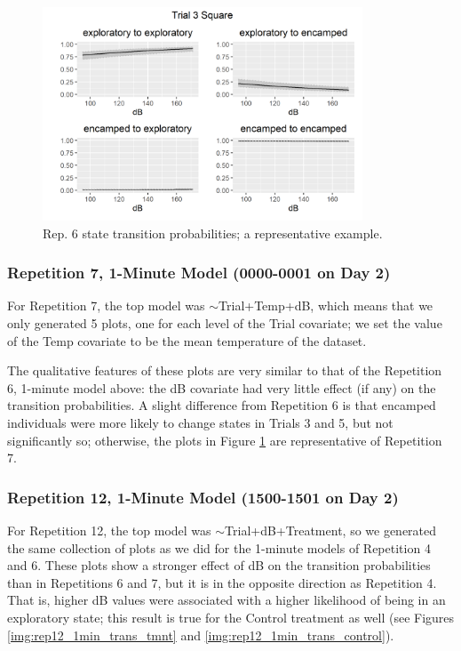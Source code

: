 \documentclass[12pt]{article}
\begin{document}
			\begin{figure}
				\centering
				\includegraphics[width=0.85\textwidth]{trans_rep_6_trial_3_Square.png}
				\caption{Rep. 6 state transition probabilities; a representative example.}
				\label{img:rep6_1min_trans_tmnt}				
			\end{figure}
		
		\subsubsection{Repetition 7, 1-Minute Model (0000-0001 on Day 2)}
		
			For Repetition 7, the top model was $\sim$Trial+Temp+dB, which means that we only generated 5 plots, one for each level of the Trial covariate; we set the value of the Temp covariate to be the mean temperature of the dataset.
			
			The qualitative features of these plots are very similar to that of the Repetition 6, 1-minute model above: the dB covariate had very little effect (if any) on the transition probabilities. A slight difference from Repetition 6 is that encamped individuals were more likely to change states in Trials 3 and 5, but not significantly so; otherwise, the plots in Figure \ref{img:rep6_1min_trans_tmnt} are representative of Repetition 7.
		
		\subsubsection{Repetition 12, 1-Minute Model (1500-1501 on Day 2)}
		
			For Repetition 12, the top model was $\sim$Trial+dB+Treatment, so we generated the same collection of plots as we did for the 1-minute models of Repetition 4 and 6. These plots show a stronger effect of dB on the transition probabilities than in Repetitions 6 and 7, but it is in the opposite direction as Repetition 4. That is, higher dB values were associated with a higher likelihood of being in an exploratory state; this result is true for the Control treatment as well (see Figures \ref{img:rep12_1min_trans_tmnt} and \ref{img:rep12_1min_trans_control}).
			
\end{document}
